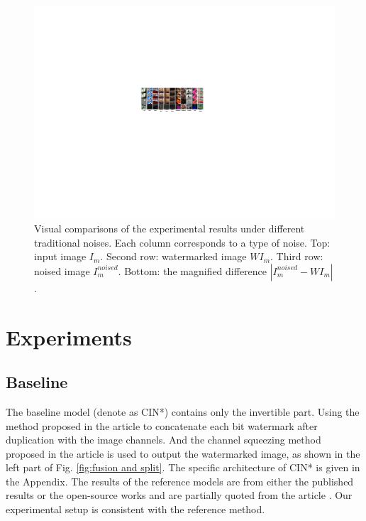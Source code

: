 \documentclass[sigconf]{acmart}
\begin{document}
\begin{figure}[]
	\centering 
	\includegraphics[width=1.0\linewidth]{picture/experiment1.pdf} 
	\caption{
		Visual comparisons of the experimental results under different traditional noises. Each column corresponds to a type of noise. Top: input image $I_{m}$. Second row: watermarked image $WI_{m}$. Third row: noised image $I_{m}^{noised}$. Bottom: the magnified difference $|I_{m}^{noised}-WI_{m}|$.
	}
	\label{fig:Expermient images}
\end{figure}



\section{Experiments}

\subsection{Baseline}

The baseline model (denote as CIN*) contains only the invertible part. Using the method proposed in the article \cite{zhu2018hidden} to concatenate each bit watermark after duplication with the image channels. And the channel squeezing method proposed in the article \cite{cheng2021iicnet} is used to output the watermarked image, as shown in the left part of Fig. \ref{fig:fusion and split}. The specific architecture of CIN* is given in the Appendix.
The results of the reference models are from either the published results or the open-source works and are partially quoted from the article \cite{zhang2020robust}. Our experimental setup is consistent with the reference method. 
\end{document}
